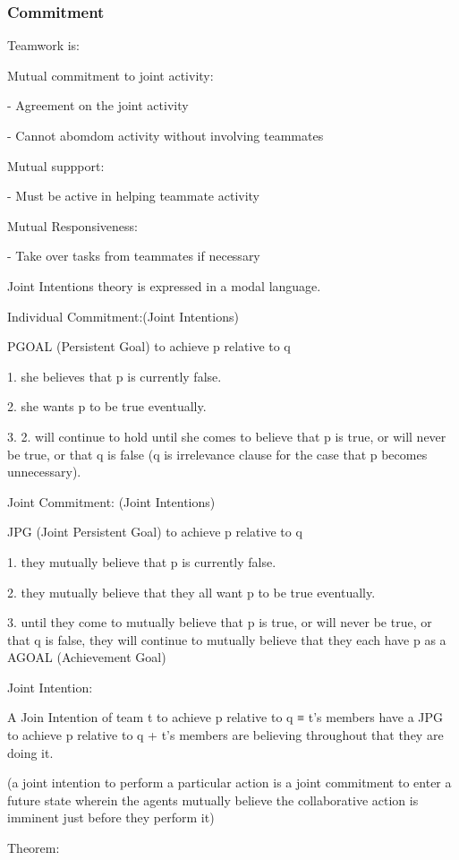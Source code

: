 \documentclass[11pt]{article}
\begin{document}
\subsubsection{Commitment}

Teamwork is:

Mutual commitment to joint activity:

- Agreement on the joint activity

- Cannot abomdom activity without involving teammates

Mutual suppport:

- Must be active in helping teammate activity

Mutual Responsiveness:

- Take over tasks from teammates if necessary

Joint Intentions theory is expressed in a modal language.

Individual Commitment:(Joint Intentions)

PGOAL (Persistent Goal) to achieve p relative to q

1. she believes that p is currently false.

2. she wants p to be true eventually.

3. 2. will continue to hold until she comes to believe that p is true, or will
never be true, or that q is false (q is irrelevance clause for the case that p
becomes unnecessary).

Joint Commitment: (Joint Intentions)

JPG (Joint Persistent Goal) to achieve p relative to q

1. they mutually believe that p is currently false.

2. they mutually believe that they all want p to be true eventually.

3. until they come to mutually believe that p is true, or will never be true, or
that q is false, they will continue to mutually believe that they each have p as
a AGOAL (Achievement Goal)

Joint Intention:

A Join Intention of team t to achieve p relative to q
≡
t’s members have a JPG to achieve p relative to q 
+
t’s members are believing throughout that they are doing it.

(a joint intention to perform a particular action is a joint commitment to enter
a future state wherein the agents mutually believe the collaborative action is
imminent just before they perform it)

Theorem:
\end{document}
